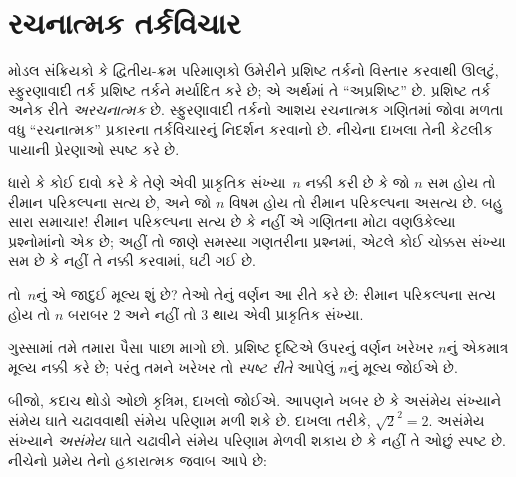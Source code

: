 
\label{guunit:OLP-0491}


\begingroup
\makeatletter{}\makeatother

\label{guunit:OLP-0492}


\begingroup
\makeatletter{}\makeatother


\section{રચનાત્મક તર્કવિચાર}
\label{guunit:OLP-0493}


મોડલ સંક્રિયકો કે દ્વિતીય-ક્રમ પરિમાણકો ઉમેરીને પ્રશિષ્ટ તર્કનો
વિસ્તાર કરવાથી ઊલટું, સ્ફુરણાવાદી તર્ક પ્રશિષ્ટ તર્કને મર્યાદિત
કરે છે; એ અર્થમાં તે ``અપ્રશિષ્ટ'' છે. પ્રશિષ્ટ તર્ક અનેક રીતે
\emph{અરચનાત્મક} છે. સ્ફુરણાવાદી તર્કનો આશય રચનાત્મક ગણિતમાં
જોવા મળતા વધુ ``રચનાત્મક'' પ્રકારના તર્કવિચારનું નિદર્શન કરવાનો
છે. નીચેના દાખલા તેની કેટલીક પાયાની પ્રેરણાઓ સ્પષ્ટ કરે છે.

ધારો કે કોઈ દાવો કરે કે તેણે એવી પ્રાકૃતિક સંખ્યા~$n$ નક્કી
કરી છે કે જો $n$ સમ હોય તો રીમાન પરિકલ્પના સત્ય છે, અને જો
$n$ વિષમ હોય તો રીમાન પરિકલ્પના અસત્ય છે. બહુ સારા સમાચાર!{}
રીમાન પરિકલ્પના સત્ય છે કે નહીં એ ગણિતના મોટા વણઉકેલ્યા
પ્રશ્નોમાંનો એક છે; અહીં તો જાણે સમસ્યા ગણતરીના પ્રશ્નમાં,
એટલે કોઈ ચોક્કસ સંખ્યા સમ છે કે નહીં તે નક્કી કરવામાં, ઘટી
ગઈ છે.

તો~$n$નું એ જાદુઈ મૂલ્ય શું છે? તેઓ તેનું વર્ણન આ રીતે કરે છે:
રીમાન પરિકલ્પના સત્ય હોય તો $n$ બરાબર $2$ અને નહીં તો $3$
થાય એવી પ્રાકૃતિક સંખ્યા.

ગુસ્સામાં તમે તમારા પૈસા પાછા માગો છો. પ્રશિષ્ટ દૃષ્ટિએ ઉપરનું
વર્ણન ખરેખર $n$નું એકમાત્ર મૂલ્ય નક્કી કરે છે; પરંતુ તમને
ખરેખર તો \emph{સ્પષ્ટ રીતે} આપેલું $n$નું મૂલ્ય જોઈએ છે.

બીજો, કદાચ થોડો ઓછો કૃત્રિમ, દાખલો જોઈએ. આપણને ખબર છે કે
અસંમેય સંખ્યાને સંમેય ઘાતે ચઢાવવાથી સંમેય પરિણામ મળી શકે છે.
દાખલા તરીકે, $\sqrt{2}^2 = 2$. અસંમેય સંખ્યાને
\emph{અસંમેય} ઘાતે ચઢાવીને સંમેય પરિણામ મેળવી શકાય છે કે
નહીં તે ઓછું સ્પષ્ટ છે. નીચેનો પ્રમેય તેનો હકારાત્મક જવાબ
આપે છે:

